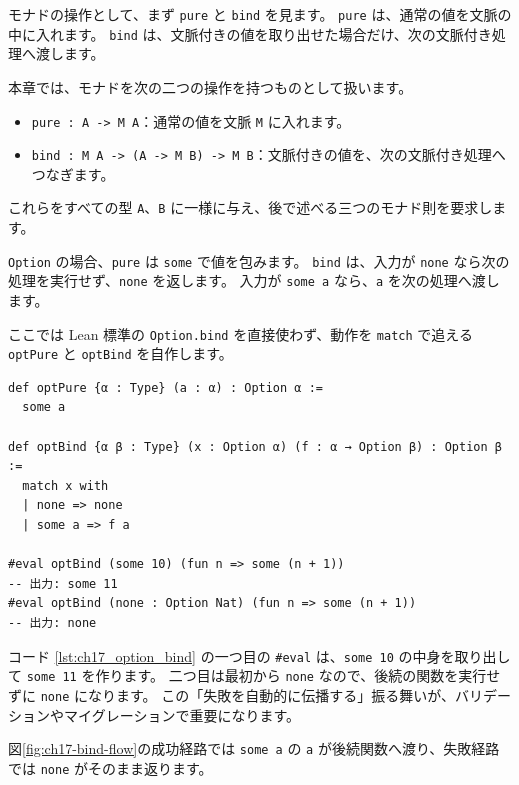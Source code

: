 モナドの操作として、まず \texttt{pure} と \texttt{bind} を見ます。
\texttt{pure} は、通常の値を文脈の中に入れます。
\texttt{bind} は、文脈付きの値を取り出せた場合だけ、次の文脈付き処理へ渡します。

本章では、モナドを次の二つの操作を持つものとして扱います。
\begin{itemize}
\item \texttt{pure : A -> M A}：通常の値を文脈 \texttt{M} に入れます。
\item \texttt{bind : M A -> (A -> M B) -> M B}：文脈付きの値を、次の文脈付き処理へつなぎます。
\end{itemize}
これらをすべての型 \texttt{A}、\texttt{B} に一様に与え、後で述べる三つのモナド則を要求します。

\texttt{Option} の場合、\texttt{pure} は \texttt{some} で値を包みます。
\texttt{bind} は、入力が \texttt{none} なら次の処理を実行せず、\texttt{none} を返します。
入力が \texttt{some a} なら、\texttt{a} を次の処理へ渡します。

ここでは Lean 標準の \texttt{Option.bind} を直接使わず、動作を \texttt{match} で追える \texttt{optPure} と \texttt{optBind} を自作します。

\begin{listing}[htbp]
\begin{verbatim}
def optPure {α : Type} (a : α) : Option α :=
  some a

def optBind {α β : Type} (x : Option α) (f : α → Option β) : Option β :=
  match x with
  | none => none
  | some a => f a

#eval optBind (some 10) (fun n => some (n + 1))
-- 出力: some 11
#eval optBind (none : Option Nat) (fun n => some (n + 1))
-- 出力: none
\end{verbatim}
\caption{\texttt{optPure} と \texttt{optBind}}
\label{lst:ch17_option_bind}
\end{listing}

コード \ref{lst:ch17_option_bind} の一つ目の \texttt{\#eval} は、\texttt{some 10} の中身を取り出して \texttt{some 11} を作ります。
二つ目は最初から \texttt{none} なので、後続の関数を実行せずに \texttt{none} になります。
この「失敗を自動的に伝播する」振る舞いが、バリデーションやマイグレーションで重要になります。

図\ref{fig:ch17-bind-flow}の成功経路では \texttt{some a} の \texttt{a} が後続関数へ渡り、失敗経路では \texttt{none} がそのまま返ります。


